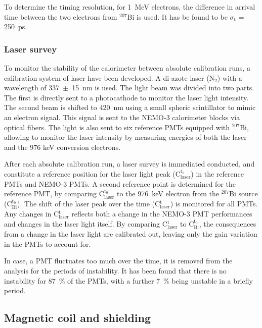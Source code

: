 \documentclass[main.tex]{subfiles}
\begin{document}
\bigskip


\NI To determine the timing resolution, for 1~MeV electrons, the difference in arrival time between the two electrons from $^{\text{207}}$Bi is used. It has be found to be $\sigma_{\text{t}}$ = 250~ps.

 
\subsubsection{Laser survey}


\NI To monitor the stability of the calorimeter between absolute calibration runs, a calibration system of laser have been developed. A di-azote laser (N$_\text{2}$) with a wavelength of 337~$\pm$~15~nm is used. The light beam was divided into two parts. The first is directly sent to a photocathode to monitor the laser light intensity. The second beam is shifted to 420~nm using a small spheric scintillator to mimic an electron signal. This signal is sent to the NEMO-3 calorimeter blocks via optical fibers. The light is also sent to six reference PMTs equipped with $^{\text{207}}$Bi, allowing to monitor the laser intensity by measuring energies of both the laser and the 976 keV conversion electrons.


\bigskip


\NI After each absolute calibration run, a laser survey is immediated conducted, and constitute a reference position for the laser light peak (C$^{\text{t}_\text{0}}_{\text{laser}}$) in the reference PMTs and NEMO-3 PMTs. A second reference point is determined for the reference PMT, by comparing C$^{\text{t}_\text{0}}_{\text{laser}}$ to the 976~keV electron from the $^{\text{207}}$Bi source (C$^{\text{t}_\text{0}}_{\text{Bi}}$). The shift of the laser peak over the time (C$^{\text{t}}_{\text{laser}}$) is monitored for all PMTs. Any changes in C$^{\text{t}}_{\text{laser}}$ reflects both a change in the NEMO-3 PMT performances and changes in the laser light itself. By comparing C$^{\text{t}}_{\text{laser}}$ to C$^{\text{t}_\text{0}}_{\text{Bi}}$, the consequences from a change in the laser light are calibrated out, leaving only the gain variation in the PMTs to account for.


\bigskip


\NI In case, a PMT fluctuates too much over the time, it is removed from the analysis for the periods of instability. It has been found that there is no instability for 87~\% of the PMTs, with a further 7~\% being unstable in a briefly period.

\subsection{Magnetic coil and shielding}
\end{document}
